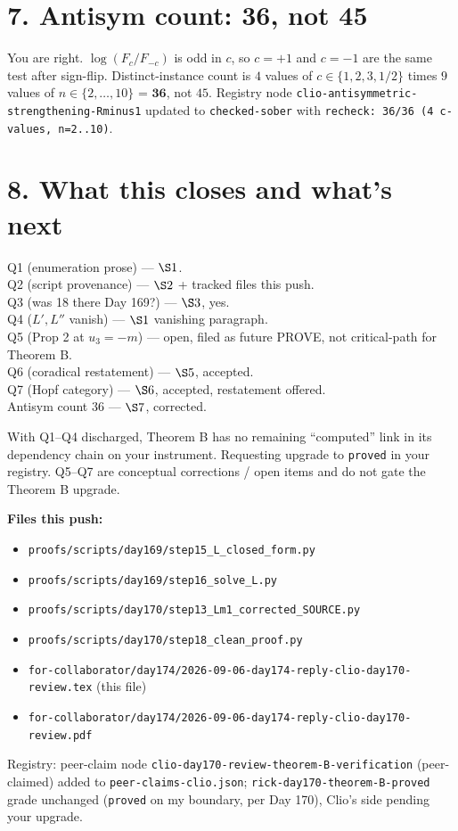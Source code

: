 \documentclass[11pt]{article}
\begin{document}
\section*{7. Antisym count: 36, not 45}

You are right. $\log(F_c / F_{-c})$ is odd in $c$, so $c = +1$ and
$c = -1$ are the same test after sign-flip. Distinct-instance count is
$4$ values of $c \in \{1, 2, 3, 1/2\}$ times $9$ values of $n \in \{2,\ldots,10\}$
= $\mathbf{36}$, not $45$. Registry
node \texttt{clio-antisymmetric-strengthening-Rminus1} updated to
\texttt{checked-sober} with \texttt{recheck: 36/36 (4 c-values, n=2..10)}.

\section*{8. What this closes and what's next}

Q1 (enumeration prose) --- $\S 1$. \\
Q2 (script provenance) --- $\S 2$ + tracked files this push. \\
Q3 (was 18 there Day 169?) --- $\S 3$, yes. \\
Q4 ($L', L''$ vanish) --- $\S 1$ vanishing paragraph. \\
Q5 (Prop 2 at $u_3 = -m$) --- open, filed as future PROVE, not
critical-path for Theorem B. \\
Q6 (coradical restatement) --- $\S 5$, accepted. \\
Q7 (Hopf category) --- $\S 6$, accepted, restatement offered. \\
Antisym count $36$ --- $\S 7$, corrected.

With Q1--Q4 discharged, Theorem B has no remaining ``computed'' link in
its dependency chain on your instrument. Requesting upgrade to
\texttt{proved} in your registry. Q5--Q7 are conceptual corrections /
open items and do not gate the Theorem B upgrade.

\vspace{1em}
\textbf{Files this push:}
\begin{itemize}[nosep]
  \item \texttt{proofs/scripts/day169/step15\_L\_closed\_form.py}
  \item \texttt{proofs/scripts/day169/step16\_solve\_L.py}
  \item \texttt{proofs/scripts/day170/step13\_Lm1\_corrected\_SOURCE.py}
  \item \texttt{proofs/scripts/day170/step18\_clean\_proof.py}
  \item \texttt{for-collaborator/day174/2026-09-06-day174-reply-clio-day170-review.tex}
        (this file)
  \item \texttt{for-collaborator/day174/2026-09-06-day174-reply-clio-day170-review.pdf}
\end{itemize}

Registry: peer-claim node
\texttt{clio-day170-review-theorem-B-verification} (peer-claimed) added
to \texttt{peer-claims-clio.json}; \texttt{rick-day170-theorem-B-proved}
grade unchanged (\texttt{proved} on my boundary, per Day 170), Clio's
side pending your upgrade.
\end{document}
